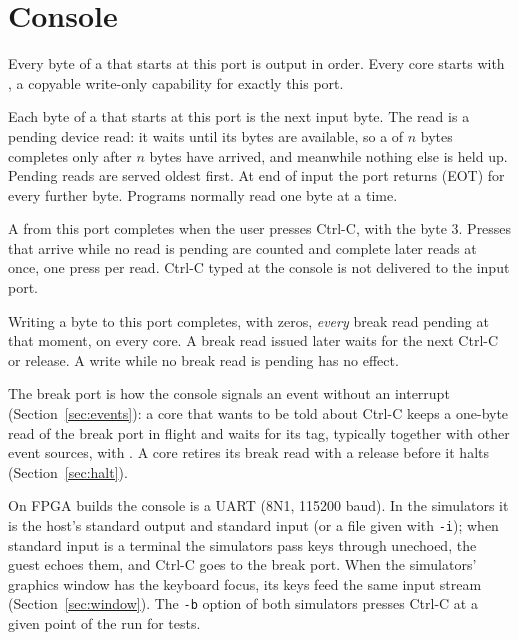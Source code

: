 \section{Console}\label{sec:console}

\begin{description}[leftmargin=1em,style=nextline]
\item[Output (port \hex{0000})] Every byte of a  that starts at this port is output in order.
  Every core starts with , a copyable write-only capability for exactly this port.
\item[Input (port \hex{0008})] Each byte of a  that starts at this port is the next input
  byte. The read is a pending device read: it waits until its bytes are available, so a  of
  $n$ bytes completes only after $n$ bytes have arrived, and meanwhile nothing else is held up. Pending
  reads are served oldest first. At end of input the port returns  (EOT) for every further
  byte. Programs normally read one byte at a time.
\item[Break (port \hex{0010})] A  from this port completes when the user presses Ctrl-C,
  with the byte 3. Presses that arrive while no read is pending are counted and complete later reads at
  once, one press per read. Ctrl-C typed at the console is not delivered to the input port.
\item[Release (port \hex{0018})] Writing a byte to this port completes, with zeros, \emph{every} break
  read pending at that moment, on every core. A break read issued later waits for the next Ctrl-C or
  release. A write while no break read is pending has no effect.
\end{description}

The break port is how the console signals an event without an interrupt
(Section~\ref{sec:events}): a core that wants to be told about Ctrl-C keeps a one-byte read of the
break port in flight and waits for its tag, typically together with other event sources, with
. A core retires its break read with a release before it halts (Section~\ref{sec:halt}).

On FPGA builds the console is a UART (8N1, 115200 baud). In the simulators it is the host's standard
output and standard input (or a file given with \texttt{-i}); when standard input is a terminal the
simulators pass keys through unechoed, the guest echoes them, and Ctrl-C goes to the break port. When
the simulators' graphics window has the keyboard focus, its keys feed the same input stream
(Section~\ref{sec:window}). The \texttt{-b} option of both simulators presses Ctrl-C at a given point
of the run for tests.

